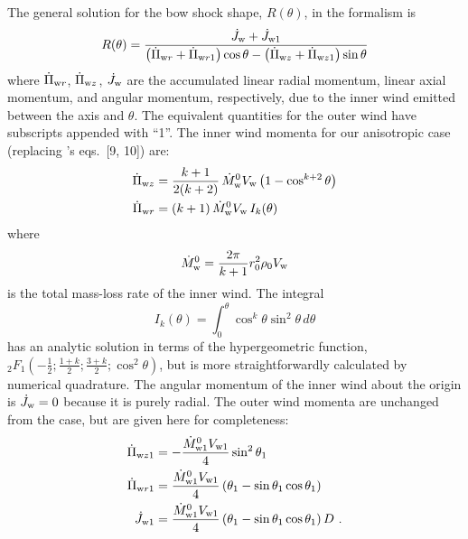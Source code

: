 The general solution for the bow shock shape, \(R(\theta)\), in the \CRW{}
formalism is
\begin{equation}
  R(\theta) = \frac {\dot{J}_{\mathrm{w}} + \dot{J}_{\mathrm{w}{}1}}
  {\left(\dot{\Pi}_{\mathrm{w}{}r}+\dot{\Pi}_{\mathrm{w}{}r1}\right)\cos\theta
    - \left(\dot{\Pi}_{\mathrm{w}{}z}+\dot{\Pi}_{\mathrm{w}{}z1}\right)\sin\theta}
  \label{eq:Rmom}
\end{equation}
where \(\dot{\Pi}_{\mathrm{w}{}r}\), \(\dot{\Pi}_{\mathrm{w}{}z}\), \(\dot{J}_{\mathrm{w}}\) are
the accumulated linear radial momentum, linear axial momentum, and
angular momentum, respectively, due to the inner wind emitted between
the axis and \(\theta\). The equivalent quantities for the outer wind have
subscripts appended with ``1''.  The inner wind momenta for our
anisotropic case (replacing \CRW{}'s eqs.~[9, 10]) are:
\begin{gather}
  \label{eq:ancantoid-momenta}
  \begin{aligned}
    \dot{\Pi}_{\mathrm{w}{}z} &= \frac{k + 1}{2(k+2)}\, \dot{M}_{\mathrm{w}}^0 V_{\mathrm{w}}
    \left(1-\cos^{k+2}\theta\right) \\
    \dot{\Pi}_{\mathrm{w}{}r} &= (k + 1)\, \dot{M}^0_{\mathrm{w}} V_{\mathrm{w}}\, I_k (\theta) 
  \end{aligned}
\end{gather}
where
\begin{equation}
  \label{eq:ancantoid-mass-loss}
  \dot{M}^0_{\mathrm{w}} = \frac{2 \pi} {k + 1} r_0^2 \rho_0 V_{\mathrm{w}}
\end{equation}
is the total mass-loss rate of the inner wind. The integral
\begin{equation}
  \label{eq:ancantoid-I-integral}
  I_k(\theta) = \int^\theta_0 \cos^k \theta \sin^2\theta \,d\theta 
\end{equation}
has an analytic solution in terms of the hypergeometric function,
\({}_2 F_1(-\tfrac12; \tfrac{1+k}2; \tfrac{3+k}2; \cos^2 \theta)\), but is
more straightforwardly calculated by numerical quadrature.  The
angular momentum of the inner wind about the origin is
\(\dot{J}_{\mathrm{w}} = 0\) because it is purely radial.  The outer wind
momenta are unchanged from the \CRW{} case, but are given here for
completeness:
\begin{gather}
  \label{eq:ancantoid-momenta-outer}
  \begin{aligned}
    \dot{\Pi}_{\mathrm{w}{}z1} & =
    -\frac{\dot{M}^0_{\mathrm{w}{}1}V_{\mathrm{w}{}1}}{4}\sin^2\theta_1\\
    \dot{\Pi}_{\mathrm{w}{}r1} & =
    \frac{\dot{M}^0_{\mathrm{w}{}1}V_{\mathrm{w}{}1}}{4}\left(\theta_1-\sin\theta_1\cos\theta_1\right)\\
    \dot{J}_{\mathrm{w}{}1} & =
    \frac{\dot{M}^0_{\mathrm{w}{}1}V_{\mathrm{w}{}1}}{4}\left(\theta_1-\sin\theta_1\cos\theta_1\right)D \ .
  \end{aligned} 
\end{gather}


